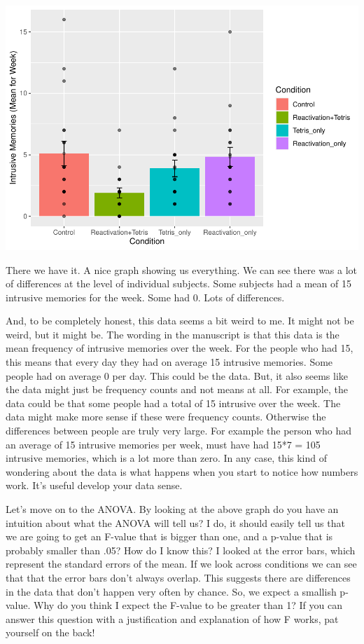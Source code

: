 \documentclass[]{book}
\begin{document}
\includegraphics{Statistics_Lab_files/figure-latex/unnamed-chunk-229-1.pdf}

There we have it. A nice graph showing us everything. We can see there
was a lot of differences at the level of individual subjects. Some
subjects had a mean of 15 intrusive memories for the week. Some had 0.
Lots of differences.

And, to be completely honest, this data seems a bit weird to me. It
might not be weird, but it might be. The wording in the manuscript is
that this data is the mean frequency of intrusive memories over the
week. For the people who had 15, this means that every day they had on
average 15 intrusive memories. Some people had on average 0 per day.
This could be the data. But, it also seems like the data might just be
frequency counts and not means at all. For example, the data could be
that some people had a total of 15 intrusive over the week. The data
might make more sense if these were frequency counts. Otherwise the
differences between people are truly very large. For example the person
who had an average of 15 intrusive memories per week, must have had 15*7
= 105 intrusive memories, which is a lot more than zero. In any case,
this kind of wondering about the data is what happens when you start to
notice how numbers work. It's useful develop your data sense.

Let's move on to the ANOVA. By looking at the above graph do you have an
intuition about what the ANOVA will tell us? I do, it should easily tell
us that we are going to get an F-value that is bigger than one, and a
p-value that is probably smaller than .05? How do I know this? I looked
at the error bars, which represent the standard errors of the mean. If
we look across conditions we can see that that the error bars don't
always overlap. This suggests there are differences in the data that
don't happen very often by chance. So, we expect a smallish p-value. Why
do you think I expect the F-value to be greater than 1? If you can
answer this question with a justification and explanation of how F
works, pat yourself on the back!
\end{document}
